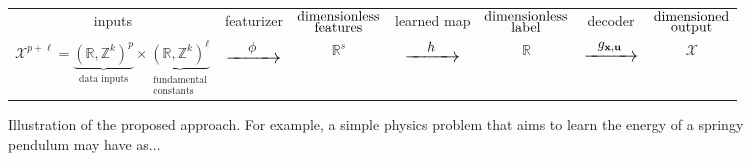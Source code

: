 \documentclass[nohyperref]{article}
\theoremstyle{plain}
\theoremstyle{definition}
\theoremstyle{remark}
\newcommand{\unit}[1]{\mathrm{#1}}
\newcommand{\kg}{\unit{kg}}
\newcommand{\m}{\unit{m}}
\newcommand{\s}{\unit{s}}
\newcommand{\sxrightarrow}[2][]{%
  \mathrel{\text{$\xrightarrow[#1]{#2}$}}%
}
\begin{document}
\begin{figure*}[]
    \centering
    \begin{tabular}{ccccccc}
         inputs & featurizer & $\let\scriptstyle\textstyle\substack{\text{dimensionless}\\ \text{features}}$ & learned map & $\let\scriptstyle\textstyle\substack{\text{dimensionless}\\ \text{label}}$ & decoder & $\let\scriptstyle\textstyle\substack{\text{dimensioned}\\ \text{output}}$ 
         \\
         $\mathcal X^{p+\ell} = \underbrace{(\mathbb R, \mathbb Z^k)^p}_{\text{data inputs}}\times \underbrace{(\mathbb R, \mathbb Z^k)^\ell}_{\substack{\text{fundamental}\\ \text{constants}}}$& ${\Large \sxrightarrow[\hspace*{1cm}]{\phi}}$ &  $\mathbb R^s$ & ${\Large \sxrightarrow[\hspace*{1cm}]{h}}$ & $\mathbb R$ & ${\Large \sxrightarrow[\hspace*{1cm}]{g_{\mathbf x, \mathbf u}}}$ & $\mathcal X$ 
    \end{tabular}
    \caption{Illustration of the proposed approach. For example, a simple physics problem that aims to learn the energy of a springy pendulum may have as... }
    \label{fig:approach}
\end{figure*}
\end{document}
